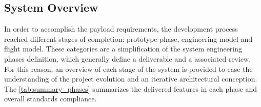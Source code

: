 
\subsection{System Overview}

In order to accomplish the payload requirements, the development process reached different stages of completion: prototype phase, engineering model and flight model. These categories are a simplification of the system engineering phases definition, which generally define a deliverable and a associated review. For this reason, an overview of each stage of the system is provided to ease the understanding of the project evolution and an iterative architectural conception. The \autoref{tab:summary_phases} summarizes the delivered features in each phase and overall standards compliance.

